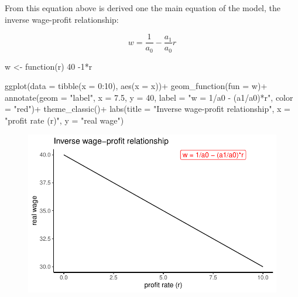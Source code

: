 \documentclass[
  letterpaper,
  DIV=11,
  numbers=noendperiod]{scrreprt}
\newenvironment{Shaded}{\begin{snugshade}}{\end{snugshade}}
\newcommand{\AttributeTok}[1]{\textcolor[rgb]{0.40,0.45,0.13}{#1}}
\newcommand{\ControlFlowTok}[1]{\textcolor[rgb]{0.00,0.23,0.31}{#1}}
\newcommand{\DecValTok}[1]{\textcolor[rgb]{0.68,0.00,0.00}{#1}}
\newcommand{\FloatTok}[1]{\textcolor[rgb]{0.68,0.00,0.00}{#1}}
\newcommand{\FunctionTok}[1]{\textcolor[rgb]{0.28,0.35,0.67}{#1}}
\newcommand{\NormalTok}[1]{\textcolor[rgb]{0.00,0.23,0.31}{#1}}
\newcommand{\OtherTok}[1]{\textcolor[rgb]{0.00,0.23,0.31}{#1}}
\newcommand{\SpecialCharTok}[1]{\textcolor[rgb]{0.37,0.37,0.37}{#1}}
\newcommand{\StringTok}[1]{\textcolor[rgb]{0.13,0.47,0.30}{#1}}
\begin{document}
From this equation above is derived one the main equation of the model,
the inverse wage-profit relationship:

\[
w = \frac{1}{a_0}-\frac{a_1}{a_0}r
\]

\begin{Shaded}
\begin{Highlighting}[]
\NormalTok{w }\OtherTok{\textless{}{-}} \ControlFlowTok{function}\NormalTok{(r) }\DecValTok{40} \SpecialCharTok{{-}}\DecValTok{1}\SpecialCharTok{*}\NormalTok{r}

\FunctionTok{ggplot}\NormalTok{(}\AttributeTok{data =} \FunctionTok{tibble}\NormalTok{(}\AttributeTok{x =} \DecValTok{0}\SpecialCharTok{:}\DecValTok{10}\NormalTok{), }\FunctionTok{aes}\NormalTok{(}\AttributeTok{x =}\NormalTok{ x))}\SpecialCharTok{+}
  \FunctionTok{geom\_function}\NormalTok{(}\AttributeTok{fun =}\NormalTok{ w)}\SpecialCharTok{+}
  \FunctionTok{annotate}\NormalTok{(}\AttributeTok{geom =} \StringTok{"label"}\NormalTok{, }\AttributeTok{x =} \FloatTok{7.5}\NormalTok{, }\AttributeTok{y =} \DecValTok{40}\NormalTok{, }\AttributeTok{label =} \StringTok{"w = 1/a0 {-} (a1/a0)*r"}\NormalTok{, }\AttributeTok{color =} \StringTok{"red"}\NormalTok{)}\SpecialCharTok{+}
  \FunctionTok{theme\_classic}\NormalTok{()}\SpecialCharTok{+}
  \FunctionTok{labs}\NormalTok{(}\AttributeTok{title =} \StringTok{"Inverse wage{-}profit relationship"}\NormalTok{,}
       \AttributeTok{x =} \StringTok{"profit rate (r)"}\NormalTok{, }\AttributeTok{y =} \StringTok{"real wage"}\NormalTok{)}
\end{Highlighting}
\end{Shaded}

\begin{figure}[H]

{\centering \includegraphics{classical-marxian-models_files/figure-pdf/unnamed-chunk-4-1.pdf}

}

\end{figure}
\end{document}
